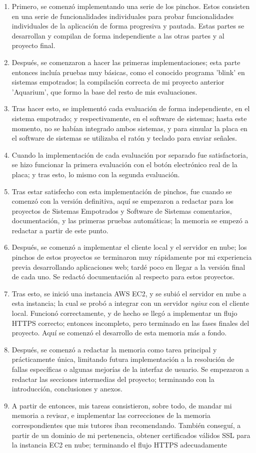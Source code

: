 \documentclass[12pt,a4paper,twoside,openright]{book}
\begin{document}
\begin{enumerate}
  \item Primero, se comenzó implementando una serie de los pinchos. Estos consisten en una serie de funcionalidades individuales para probar funcionalidades individuales de la aplicación de forma progresiva y pautada. Estas partes se desarrollan y compilan de forma independiente a las otras partes y al proyecto final.
  \item Después, se comenzaron a hacer las primeras implementaciones; esta parte entonces incluía pruebas muy básicas, como el conocido programa 'blink' en sistemas empotrados; la compilación correcta de mi proyecto anterior 'Aquarium', que formo la base del resto de mis evaluaciones.
  \item Tras hacer esto, se implementó cada evaluación de forma independiente, en el sistema empotrado; y respectivamente, en el software de sistemas; hasta este momento, no se habían integrado ambos sistemas, y para simular la placa en el software de sistemas se utilizaba el ratón y teclado para enviar señales.
  \item Cuando la implementación de cada evaluación por separado fue satisfactoria, se hizo funcionar la primera evaluación con el botón electrónico real de la placa; y tras esto, lo mismo con la segunda evaluación.
  \item Tras estar satisfecho con esta implementación de pinchos, fue cuando se comenzó con la versión definitiva, aquí se empezaron a redactar para los proyectos de Sistemas Empotrados y Software de Sistemas comentarios, documentación, y las primeras pruebas automáticas; la memoria se empezó a redactar a partir de este punto.
  \item Después, se comenzó a implementar el cliente local y el servidor en nube; los pinchos de estos proyectos se terminaron muy rápidamente por mi experiencia previa desarrollando aplicaciones web; tardé poco en llegar a la versión final de cada uno. Se redactó documentación al respecto para estos proyectos.
  \item Tras esto, se inició una instancia AWS EC2, y se subió el servidor en nube a esta instancia; la cual se probó a integrar con un servidor \textit{nginx} con el cliente local. Funcionó correctamente, y de hecho se llegó a implementar un flujo HTTPS correcto; entonces incompleto, pero terminado en las fases finales del proyecto. Aquí se comenzó el desarrollo de esta memoria más a fondo.
  \item Después, se comenzó a redactar la memoria como tarea principal y prácticamente única, limitando futura implementación a la resolución de fallas específicas o algunas mejorías de la interfaz de usuario. Se empezaron a redactar las secciones intermedias del proyecto; terminando con la introducción, conclusiones y anexos.
  \item A partir de entonces, mis tareas consistieron, sobre todo, de mandar mi memoria a revisar, e implementar las correcciones de la memoria correspondientes que mis tutores iban recomendando. También conseguí, a partir de un dominio de mi pertenencia, obtener certificados válidos SSL para la instancia EC2 en nube; terminando el flujo HTTPS adecuadamente
\end{enumerate}
\end{document}
